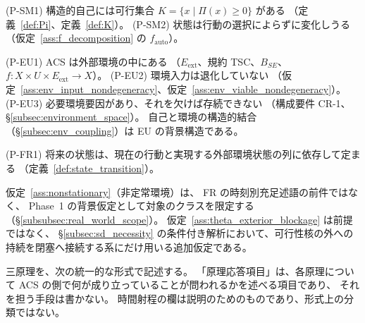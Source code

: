 \begin{description}[style=nextline]
  \item[SM の前提]
  (P-SM1) 構造的自己には可行集合 $K=\{x\mid\Pi(x)\ge0\}$ がある
  （定義~\ref{def:Pi}、定義~\ref{def:K}）。
  (P-SM2) 状態は行動の選択によらずに変化しうる
  （仮定~\ref{ass:f_decomposition} の $f_{\mathrm{auto}}$）。
  \item[EU の前提]
  (P-EU1) ACS は外部環境の中にある
  （$E_{\mathrm{ext}}$、規約 TSC、$B_{SE}$、$f:X\times U\times E_{\mathrm{ext}}\to X$）。
  (P-EU2) 環境入力は退化していない
  （仮定~\ref{ass:env_input_nondegeneracy}、仮定~\ref{ass:env_viable_nondegeneracy}）。
  (P-EU3) 必要環境要因があり、それを欠けば存続できない
  （構成要件 CR-1、\S\ref{subsec:environment_space}）。
  自己と環境の構造的結合（\S\ref{subsec:env_coupling}）は EU の背景構造である。
  \item[FR の前提]
  (P-FR1) 将来の状態は、現在の行動と実現する外部環境状態の列に依存して定まる
  （定義~\ref{def:state_transition}）。
\end{description}

仮定~\ref{ass:nonstationary}（非定常環境）は、
FR の時刻別充足述語の前件ではなく、
Phase~1 の背景仮定として対象のクラスを限定する
（\S\ref{subsubsec:real_world_scope}）。
仮定~\ref{ass:theta_exterior_blockage} は前提ではなく、
\S\ref{subsec:sd_necessity} の条件付き解析において、可行性核の外への持続を閉塞へ接続する系にだけ用いる追加仮定である。

三原理を、次の統一的な形式で記述する。
「原理応答項目」は、各原理について ACS の側で何が成り立っていることが問われるかを述べる項目であり、
それを担う手段は書かない。
時間射程の欄は説明のためのものであり、形式上の分類ではない。

